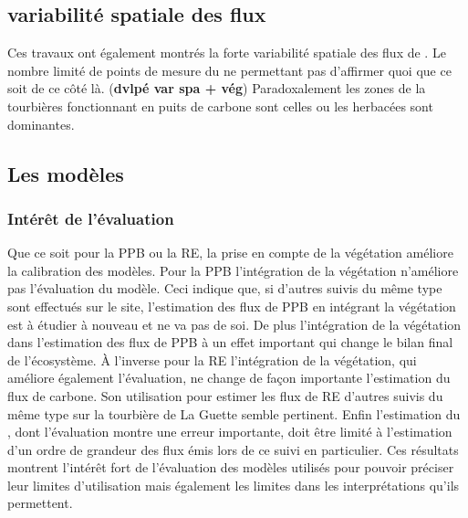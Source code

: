 \subsection*{variabilité spatiale des flux}

Ces travaux ont également montrés la forte variabilité spatiale des flux de \coo.
Le nombre limité de points de mesure du \chh ne permettant pas d'affirmer quoi que ce soit de ce côté là.
(\textbf{dvlpé var spa + vég})
Paradoxalement les zones de la tourbières fonctionnant en puits de carbone sont celles ou les herbacées sont dominantes.

\subsection*{Les modèles}

\subsubsection{Intérêt de l'évaluation}


Que ce soit pour la PPB ou la RE, la prise en compte de la végétation améliore la calibration des modèles.
Pour la PPB l'intégration de la végétation n'améliore pas l'évaluation du modèle.
Ceci indique que, si d'autres suivis du même type sont effectués sur le site, l'estimation des flux de PPB en intégrant la végétation est à étudier à nouveau et ne va pas de soi.
De plus l'intégration de la végétation dans l'estimation des flux de PPB à un effet important qui change le bilan final de l'écosystème.
À l'inverse pour la RE l'intégration de la végétation, qui améliore également l'évaluation, ne change de façon importante l'estimation du flux de carbone.
Son utilisation pour estimer les flux de RE d'autres suivis du même type sur la tourbière de La Guette semble pertinent.
Enfin l'estimation du \chh, dont l'évaluation montre une erreur importante, doit être limité à l'estimation d'un ordre de grandeur des flux émis lors de ce suivi en particulier.
Ces résultats montrent l'intérêt fort de l'évaluation des modèles utilisés pour pouvoir préciser leur limites d'utilisation mais également les limites dans les interprétations qu'ils permettent.

